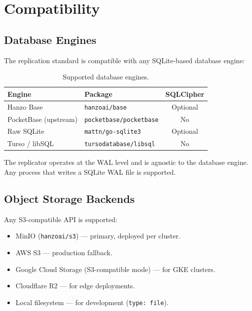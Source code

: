 \section{Compatibility}
\label{sec:compat}

\subsection{Database Engines}

The replication standard is compatible with any SQLite-based database
engine:

\begin{table}[H]
\centering
\caption{Supported database engines.}
\label{tab:engines}
\begin{tabular}{@{}llc@{}}
\toprule
\textbf{Engine} & \textbf{Package} & \textbf{SQLCipher} \\
\midrule
Hanzo Base & \texttt{hanzoai/base} & Optional \\
PocketBase (upstream) & \texttt{pocketbase/pocketbase} & No \\
Raw SQLite & \texttt{mattn/go-sqlite3} & Optional \\
Turso / libSQL & \texttt{tursodatabase/libsql} & No \\
\bottomrule
\end{tabular}
\end{table}

The replicator operates at the WAL level and is agnostic to the
database engine. Any process that writes a SQLite WAL file is
supported.

\subsection{Object Storage Backends}

Any S3-compatible API is supported:

\begin{itemize}[nosep]
  \item MinIO (\texttt{hanzoai/s3}) --- primary, deployed per cluster.
  \item AWS S3 --- production fallback.
  \item Google Cloud Storage (S3-compatible mode) --- for GKE clusters.
  \item Cloudflare R2 --- for edge deployments.
  \item Local filesystem --- for development (\texttt{type: file}).
\end{itemize}

